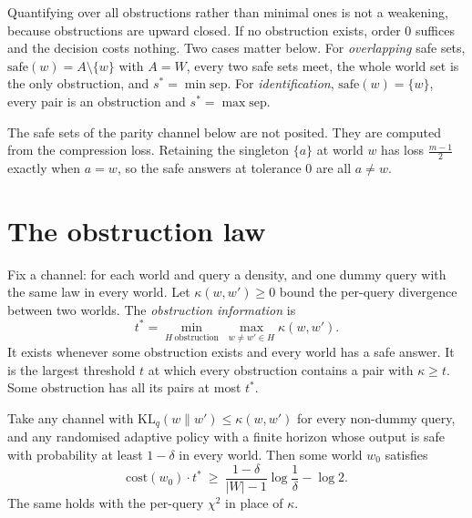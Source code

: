 Quantifying over all obstructions rather than minimal ones is not a weakening, because
obstructions are upward closed. If no obstruction exists, order $0$ suffices and the decision
costs nothing. Two cases matter below. For \emph{overlapping} safe sets,
$\mathrm{safe}(w)=A\setminus\{w\}$ with $A=W$, every two safe sets meet, the whole world set is
the only obstruction, and $s^{*}=\min\mathrm{sep}$. For \emph{identification},
$\mathrm{safe}(w)=\{w\}$, every pair is an obstruction and $s^{*}=\max\mathrm{sep}$.


The safe sets of the parity channel below are not posited. They are computed from the
compression loss. Retaining the singleton $\{a\}$ at world $w$ has loss $\frac{m-1}{2}$ exactly
when $a=w$, so the safe answers at tolerance $0$ are all $a\ne w$.


\section{The obstruction law}
\label{sec:law}

Fix a channel: for each world and query a density, and one dummy query with the same law in
every world. Let $\kappa(w,w')\ge0$ bound the per-query divergence between two worlds. The
\emph{obstruction information} is
\[
t^{*}=\min_{H\ \text{obstruction}}\ \max_{w\ne w'\in H}\kappa(w,w').
\]
It exists whenever some obstruction exists and every world has a safe answer. It is the largest
threshold $t$ at which every obstruction contains a pair with $\kappa\ge t$. Some obstruction
has all its pairs at most $t^{*}$.


\begin{theorem}
\label{thm:lower}
Take any channel with $\mathrm{KL}_{q}(w\|w')\le\kappa(w,w')$ for every non-dummy query, and
any randomised adaptive policy with a finite horizon whose output is safe with probability at
least $1-\delta$ in every world. Then some world $w_{0}$ satisfies
\[
\mathrm{cost}(w_{0})\cdot t^{*}\ \ge\ \frac{1-\delta}{|W|-1}\log\frac1\delta-\log2 .
\]
The same holds with the per-query $\chi^{2}$ in place of $\kappa$.
\end{theorem}

